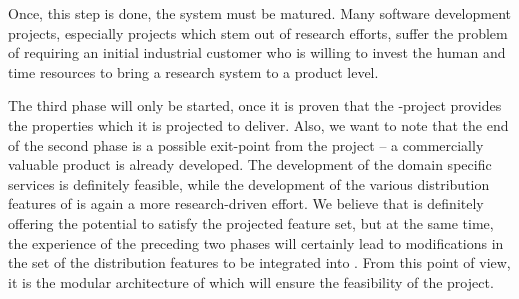 \documentclass[a4paper, 10pt]{book}
\begin{document}
                                        Once, this step is done, the system must be matured. Many software
                                        development projects, especially projects which stem out of research
                                        efforts, suffer the problem of requiring an initial industrial
                                        customer who is willing to invest the human and time resources to
                                        bring a research system to a product level.
 
                                        The third phase will only be started, once it is proven that the
                                        \SYNEIGHT-project provides the properties which it is projected to
                                        deliver. Also, we want to note that the end of the second phase is a
                                        possible exit-point from the project -- a commercially valuable
                                        product is already developed. The development of the domain specific
                                        services is definitely feasible, while the development of the various
                                        distribution features of \SYNEIGHT is again a more research-driven
                                        effort. We believe that \SYNEIGHT is definitely offering the potential to
                                        satisfy the projected feature set, but at the same time, the
                                        experience of the preceding two phases will certainly lead to
                                        modifications in the set of the distribution features to be integrated
                                        into \SYNEIGHT. From this point of view, it is the modular architecture of
                                        \SYNEIGHT which will ensure the feasibility of the project. 





                                        
                                        


                                        
\end{document}
